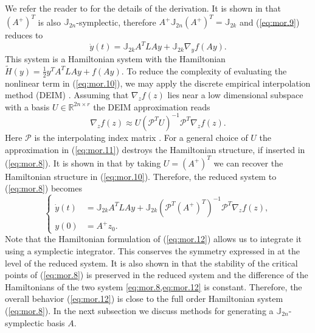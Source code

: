 We refer the reader to \cite{doi:10.1137/17M1111991} for the details of the derivation. It is shown in \cite{doi:10.1137/140978922} that $(A^+)^T$ is also $\mathbb J_{2n}$-symplectic, therefore $A^+ \mathbb J_{2n} (A^+)^T = \mathbb J_{2k}$ and (\ref{eq:mor.9}) reduces to
\begin{equation} \label{eq:mor.10}
	\dot y(t) = \mathbb J_{2k} A^T L A y + \mathbb J_{2k} \nabla_y f(Ay).
\end{equation}
This system is a Hamiltonian system with the Hamiltonian $\tilde H(y) = \frac 1 2 y^T A^T L A y + f(Ay)$. To reduce the complexity of evaluating the nonlinear term in (\ref{eq:mor.10}), we may apply the discrete empirical interpolation method (DEIM) \cite{barrault2004empirical,Chaturantabut:2010cz,wirtz2014posteriori}. Assuming that $\nabla_z f(z)$ lies near a low dimensional subspace with a basis $U\in \mathbb R^{2n\times r}$ the DEIM approximation reads
\begin{equation} \label{eq:mor.11}
	\nabla_z f(z) \approx U (\mathcal P^T U)^{-1} \mathcal P^T \nabla_z f(z).
\end{equation}
Here $\mathcal P$ is the interpolating index matrix \cite{Chaturantabut:2010cz}. For a general choice of $U$ the approximation in (\ref{eq:mor.11}) destroys the Hamiltonian structure, if inserted in (\ref{eq:mor.8}). It is shown in \cite{doi:10.1137/17M1111991} that by taking $U = (A^+)^T$ we can recover the Hamiltonian structure in (\ref{eq:mor.10}). Therefore, the reduced system to (\ref{eq:mor.8}) becomes
\begin{equation} \label{eq:mor.12}
\left\{
\begin{aligned}
	\dot y(t) &= \mathbb J_{2k} A^T L A y + \mathbb J_{2k} (\mathcal P^T (A^+)^T)^{-1} \mathcal P^T \nabla_z f(z), \\
	y(0) &= A^+ z_0.
\end{aligned}
\right.
\end{equation}
Note that the Hamiltonian formulation of (\ref{eq:mor.12}) allows us to integrate it using a symplectic integrator. This conserves the symmetry expressed in  at the level of the reduced system. It is also shown in \cite{doi:10.1137/17M1111991,doi:10.1137/140978922} that the stability of the critical points of (\ref{eq:mor.8}) is preserved in the reduced system and the difference of the Hamiltonians of the two system \cref{eq:mor.8,eq:mor.12} is constant. Therefore, the overall behavior (\ref{eq:mor.12}) is close to the full order Hamiltonian system (\ref{eq:mor.8}). In the next subsection we discuss methods for generating a $\mathbb J_{2n}$-symplectic basis $A$.


